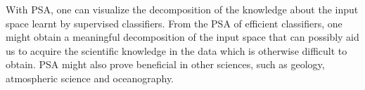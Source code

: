 With PSA, one can visualize the decomposition of the
knowledge about the input space learnt by supervised classifiers.
%
From the PSA of efficient classifiers, one might obtain a meaningful decomposition of the input
space that can possibly aid us to acquire the scientific knowledge in the data
which is otherwise difficult to obtain.
%
PSA might also prove beneficial in other sciences, such as geology, atmospheric science and oceanography.
